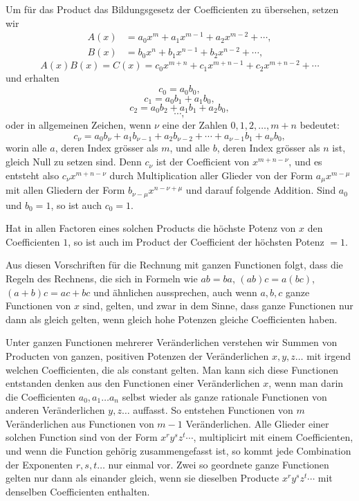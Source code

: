 \documentclass[11pt]{article}
\begin{document}
Um für das Product das Bildungsgesetz der Coefficienten zu übersehen, setzen wir
\begin{equation}
\begin{aligned}
 A(x)&=a_0x^m+a_1x^{m-1}+a_2x^{m-2}+\cdots,\\
 B(x)&=b_0x^n+b_1x^{n-1}+b_2x^{n-2}+\cdots,
\end{aligned}
\tag{2}
\end{equation}
\begin{equation}
 A(x)B(x)=C(x)=c_0x^{m+n}+c_1x^{m+n-1}+c_2x^{m+n-2}+\cdots
\tag{3}
\end{equation}
und erhalten
\[
 c_0=a_0b_0,
\]
\[
 c_1=a_0b_1+a_1b_0,
\]
\[
 c_2=a_0b_2+a_1b_1+a_2b_0,
\]
\[
 \cdots,
\]
oder in allgemeinen Zeichen, wenn $\nu$ eine der Zahlen $0,1,2,\ldots,m+n$ bedeutet:
\begin{equation}
 c_\nu=a_0b_\nu+a_1b_{\nu-1}+a_2b_{\nu-2}+\cdots+a_{\nu-1}b_1+a_\nu b_0,
\tag{4}
\end{equation}
worin alle $a$, deren Index grösser als $m$, und alle $b$, deren Index grösser als $n$ ist, gleich Null zu setzen sind. Denn $c_\nu$ ist der Coefficient von $x^{m+n-\nu}$, und es entsteht also $c_\nu x^{m+n-\nu}$ durch Multiplication aller Glieder von der Form $a_\mu x^{m-\mu}$ mit allen Gliedern der Form $b_{\nu-\mu}x^{n-\nu+\mu}$ und darauf folgende Addition. Sind $a_0$ und $b_0=1$, so ist auch $c_0=1$.

Hat in allen Factoren eines solchen Products die höchste Potenz von $x$ den Coefficienten $1$, so ist auch im Product der Coefficient der höchsten Potenz $=1$.

Aus diesen Vorschriften für die Rechnung mit ganzen Functionen folgt, dass die Regeln des Rechnens, die sich in Formeln wie $ab=ba$, $(ab)c=a(bc)$, $(a+b)c=ac+bc$ und ähnlichen aussprechen, auch wenn $a,b,c$ ganze Functionen von $x$ sind, gelten, und zwar in dem Sinne, dass ganze Functionen nur dann als gleich gelten, wenn gleich hohe Potenzen gleiche Coefficienten haben.

Unter ganzen Functionen mehrerer Veränderlichen verstehen wir Summen von Producten von ganzen, positiven Potenzen der Veränderlichen $x,y,z\ldots$ mit irgend welchen Coefficienten, die als constant gelten. Man kann sich diese Functionen entstanden denken aus den Functionen einer Veränderlichen $x$, wenn man darin die Coefficienten $a_0,a_1\ldots a_n$ selbst wieder als ganze rationale Functionen von anderen Veränderlichen $y,z\ldots$ auffasst. So entstehen Functionen von $m$ Veränderlichen aus Functionen von $m-1$ Veränderlichen. Alle Glieder einer solchen Function sind von der Form $x^r y^s z^t\cdots$, multiplicirt mit einem Coefficienten, und wenn die Function gehörig zusammengefasst ist, so kommt jede Combination der Exponenten $r,s,t\ldots$ nur einmal vor. Zwei so geordnete ganze Functionen gelten nur dann als einander gleich, wenn sie dieselben Producte $x^r y^s z^t\cdots$ mit denselben Coefficienten enthalten.
\end{document}
